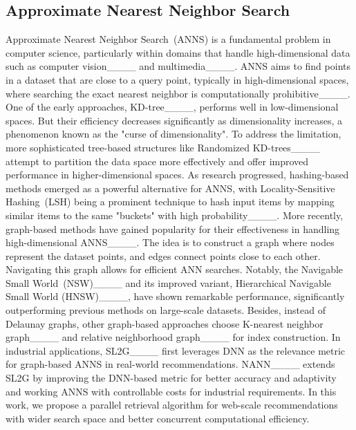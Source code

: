 \subsection{Approximate Nearest Neighbor Search}
Approximate Nearest Neighbor Search~(ANNS) is a fundamental problem in computer science, particularly within domains that handle high-dimensional data such as computer vision____ and multimedia____. ANNS aims to find points in a dataset that are close to a query point, typically in high-dimensional spaces, where searching the exact nearest neighbor is computationally prohibitive____.
One of the early approaches, KD-tree____, performs well in low-dimensional spaces. But their efficiency decreases significantly as dimensionality increases, a phenomenon known as the "curse of dimensionality". To address the limitation, more sophisticated tree-based structures like Randomized KD-trees____ attempt to partition the data space more effectively and offer improved performance in higher-dimensional spaces.
As research progressed, hashing-based methods emerged as a powerful alternative for ANNS, with Locality-Sensitive Hashing~(LSH) being a prominent technique to hash input items by mapping similar items to the same "buckets" with high probability____.
More recently, graph-based methods have gained popularity for their effectiveness in handling high-dimensional ANNS____. The idea is to construct a graph where nodes represent the dataset points, and edges connect points close to each other. Navigating this graph allows for efficient ANN searches.
Notably, the Navigable Small World~(NSW)____ and its improved variant, Hierarchical Navigable Small World (HNSW)____, have shown remarkable performance, significantly outperforming previous methods on large-scale datasets.
Besides, instead of Delaunay graphs, other graph-based approaches choose K-nearest neighbor graph____ and relative neighborhood graph____ for index construction.
In industrial applications, SL2G____ first leverages DNN as the relevance metric for graph-based ANNS in real-world recommendations.
NANN____ extends SL2G by improving the DNN-based metric for better accuracy and adaptivity and working ANNS with controllable costs for industrial requirements.
In this work, we propose a parallel retrieval algorithm for web-scale recommendations with wider search space and better concurrent computational efficiency.